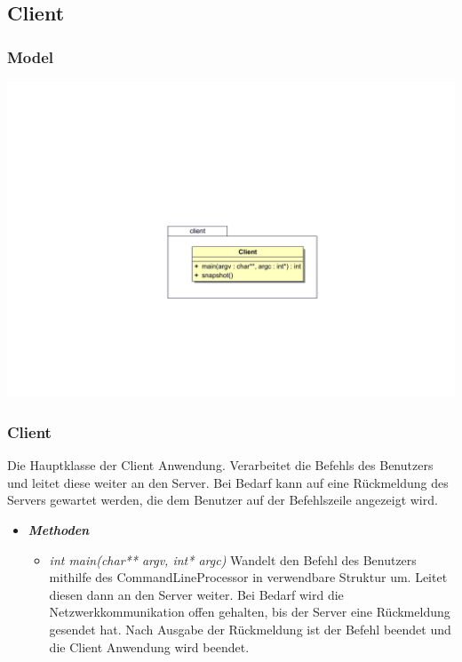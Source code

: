 \documentclass[a4paper,12pt]{article}
\begin{document}
\subsection{Client}

\subsubsection{Model}

\includegraphics[width=\textwidth]{client}

\subsubsection{Client}

Die Hauptklasse der Client Anwendung. Verarbeitet die Befehls des Benutzers und leitet diese weiter an den Server. Bei Bedarf kann auf eine Rückmeldung des Servers gewartet werden, die dem Benutzer auf der Befehlszeile angezeigt wird.

\begin{itemize}[label={}]

	\item \textit{\textbf{Methoden}}
		\begin{itemize}[label={\textbullet}]

			\item \textit{int main(char** argv, int* argc)} Wandelt den Befehl des Benutzers mithilfe des CommandLineProcessor in verwendbare Struktur um. Leitet diesen dann an den Server weiter. Bei Bedarf wird die Netzwerkkommunikation offen gehalten, bis der Server eine Rückmeldung gesendet hat. Nach Ausgabe der Rückmeldung ist der Befehl beendet und die Client Anwendung wird beendet.
			
		\end{itemize}

\end{itemize}
\end{document}
